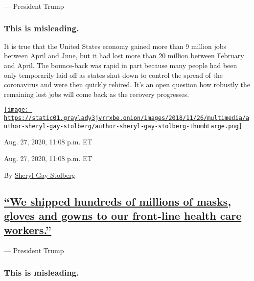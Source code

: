 --- President Trump

\hypertarget{this-is-misleading--2}{%
\subsubsection{\texorpdfstring{\textbf{This is misleading.}
}{This is misleading. }}\label{this-is-misleading--2}}

It is true that the United States economy gained more than 9 million
jobs between April and June, but it had lost more than 20 million
between February and April. The bounce-back was rapid in part because
many people had been only temporarily laid off as states shut down to
control the spread of the coronavirus and were then quickly rehired.
It's an open question how robustly the remaining lost jobs will come
back as the recovery progresses.

\href{https://www.nytimes3xbfgragh.onion/by/sheryl-gay-stolberg}{\texttt{[image: https://static01.graylady3jvrrxbe.onion/images/2018/11/26/multimedia/author-sheryl-gay-stolberg/author-sheryl-gay-stolberg-thumbLarge.png]}}

Aug. 27, 2020, 11:08 p.m. ET

Aug. 27, 2020, 11:08 p.m. ET

By
\href{https://www.nytimes3xbfgragh.onion/by/sheryl-gay-stolberg}{Sheryl
Gay Stolberg}

\hypertarget{we-shipped-hundreds-of-millions-of-masks-gloves-and-gowns-to-our-front-line-health-care-workers}{%
\subsection{\texorpdfstring{\protect\hyperlink{we-shipped-hundreds-of-millions-of-masks-gloves-and-gowns-to-our-front-line-health-care-workers}{``We
shipped hundreds of millions of masks, gloves and gowns to our
front-line health care
workers.''}}{``We shipped hundreds of millions of masks, gloves and gowns to our front-line health care workers.''}}\label{we-shipped-hundreds-of-millions-of-masks-gloves-and-gowns-to-our-front-line-health-care-workers}}

--- President Trump

\hypertarget{this-is-misleading--3}{%
\subsubsection{\texorpdfstring{\textbf{This is misleading}.
}{This is misleading. }}\label{this-is-misleading--3}}

